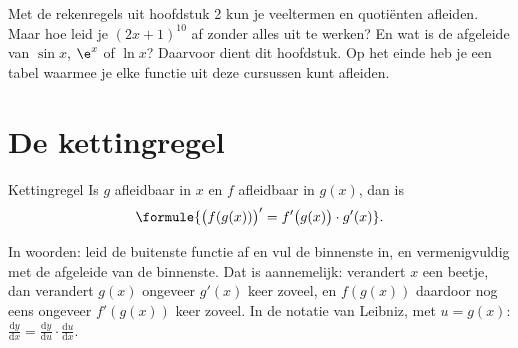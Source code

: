 %



Met de rekenregels uit hoofdstuk 2 kun je veeltermen en quotiënten afleiden. Maar hoe leid je $(2x + 1)^{10}$ af zonder alles uit te werken? En wat is de afgeleide van $\sin x$, $\e^x$ of $\ln x$? Daarvoor dient dit hoofdstuk. Op het einde heb je een tabel waarmee je elke functie uit deze cursussen kunt afleiden.

\begin{oefeningen}[Start]

\end{oefeningen}

\section{De kettingregel}

\begin{theorie}
\begin{stelling}{Kettingregel}
Is $g$ afleidbaar in $x$ en $f$ afleidbaar in $g(x)$, dan is
\[\formule{\bigl(f(g(x))\bigr)' = f'\bigl(g(x)\bigr) \cdot g'(x)}.\]
\end{stelling}
\end{theorie}

In woorden: leid de buitenste functie af en vul de binnenste in, en vermenigvuldig met de afgeleide van de binnenste. Dat is aannemelijk: verandert $x$ een beetje, dan verandert $g(x)$ ongeveer $g'(x)$ keer zoveel, en $f(g(x))$ daardoor nog eens ongeveer $f'(g(x))$ keer zoveel. In de notatie van Leibniz, met $u = g(x)$: $\frac{\mathrm{d}y}{\mathrm{d}x} = \frac{\mathrm{d}y}{\mathrm{d}u} \cdot \frac{\mathrm{d}u}{\mathrm{d}x}$.


